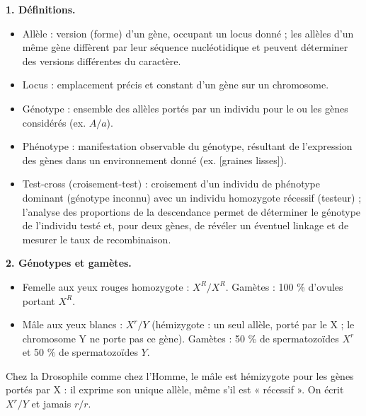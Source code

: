 \documentclass[11pt]{article}
\newcommand{\cle}[1]{{\popxbold\color{popdark}#1}}
\begin{document}
\begin{corrige}
\textbf{1. Définitions.}
\begin{itemize}
    \item \cle{Allèle} : version (forme) d'un gène, occupant un locus donné ; les allèles d'un même gène diffèrent par leur séquence nucléotidique et peuvent déterminer des versions différentes du caractère.
    \item \cle{Locus} : emplacement précis et constant d'un gène sur un chromosome.
    \item \cle{Génotype} : ensemble des allèles portés par un individu pour le ou les gènes considérés (ex. $A/a$).
    \item \cle{Phénotype} : manifestation observable du génotype, résultant de l'expression des gènes dans un environnement donné (ex. [graines lisses]).
    \item \cle{Test-cross} (croisement-test) : croisement d'un individu de phénotype dominant (génotype inconnu) avec un individu homozygote récessif (testeur) ; l'analyse des proportions de la descendance permet de déterminer le génotype de l'individu testé et, pour deux gènes, de révéler un éventuel linkage et de mesurer le taux de recombinaison.
\end{itemize}

\textbf{2. Génotypes et gamètes.}
\begin{itemize}
    \item Femelle aux yeux rouges homozygote : $X^R / X^R$. Gamètes : 100 \% d'ovules portant $X^R$.
    \item Mâle aux yeux blancs : $X^r / Y$ (hémizygote : un seul allèle, porté par le X ; le chromosome Y ne porte pas ce gène). Gamètes : 50 \% de spermatozoïdes $X^r$ et 50 \% de spermatozoïdes $Y$.
\end{itemize}

\begin{attention}
Chez la Drosophile comme chez l'Homme, le mâle est hémizygote pour les gènes portés par X : il exprime son unique allèle, même s'il est « récessif ». On écrit $X^r/Y$ et jamais $r/r$.
\end{attention}
\end{corrige}
\end{document}
